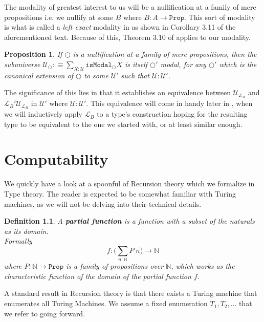 \documentclass[12pt]{report}
\newtheorem{prop}[thm]{Proposition}
\newtheorem{defn}[thm]{Definition}
\theoremstyle{definition}
\begin{document}
The modality of greatest interest to us will be a nullification at a family of mere propositions i.e. we nullify at some $B$ where $B : A \rightarrow \mathtt{Prop}$. 
This sort of modality is what is called a \textit{left exact} modality in \cite{1706.07526} as shown in Corollary 3.11 of the aforementioned text. 
Because of this, Theorem 3.10 of \cite{1706.07526} applies to our modality. 
\begin{prop}
If $\bigcirc$ is a nullification at a family of mere propositions, then the subuniverse $\mathcal{U}_\bigcirc :\equiv \sum_{X : \mathcal{U}}\mathtt{isModal}_\bigcirc X$ is itself $\bigcirc'$ modal, for any $\bigcirc' $ which is the canonical extension of $\bigcirc$ to some $\mathcal{U}'$ such that $\mathcal{U} : \mathcal{U}'$. 
\end{prop}
The significance of this lies in that it establishes an equivalence between $\mathcal{U}_{\mathcal{L}_B}$ and $\mathcal{L}_B' \mathcal{U}_{\mathcal{L}_B}$ in $\mathcal{U}'$ where $\mathcal{U} : \mathcal{U}'$. 
This equivalence will come in handy later in , when we will inductively apply $\mathcal{L}_B$ to a type's construction hoping for the resulting type to be equivalent to the one we started with, or at least similar enough.

\chapter{Computability}
We quickly have a look at a spoonful of Recursion theory which we formalize in Type theory. 
The reader is expected to be somewhat familiar with Turing machines, as we will not be delving into their technical details. 

\begin{defn}
A \textbf{partial function} is a function with a subset of the naturals as its domain.\\
Formally 
$$f : \Big(\sum_{n : \mathbb{N}} P\; n \Big) \rightarrow \mathbb{N}$$
where $P : \mathbb{N} \rightarrow \mathtt{Prop}$ is a family of propositions over $\mathbb{N}$, which works as the characteristic function of the domain of the partial function $f$.
\end{defn}

A standard result in Recursion theory is that there exists a Turing machine that enumerates all Turing Machines. 
We assume a fixed enumeration $T_1, T_2,\ldots $ that we refer to going forward. 
\end{document}
